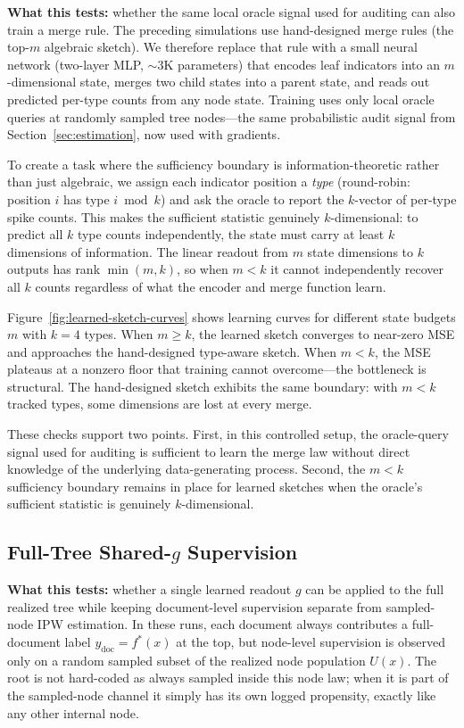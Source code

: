 \textbf{What this tests:} whether the same local oracle signal used for auditing can also train a merge rule. The preceding simulations use hand-designed merge rules (the top-$m$ algebraic sketch). We therefore replace that rule with a small neural network (two-layer MLP, ${\sim}\!3$K parameters) that encodes leaf indicators into an $m$-dimensional state, merges two child states into a parent state, and reads out predicted per-type counts from any node state. Training uses only local oracle queries at randomly sampled tree nodes---the same probabilistic audit signal from Section~\ref{sec:estimation}, now used with gradients.

To create a task where the sufficiency boundary is information-theoretic rather than just algebraic, we assign each indicator position a \emph{type} (round-robin: position $i$ has type $i \bmod k$) and ask the oracle to report the $k$-vector of per-type spike counts. This makes the sufficient statistic genuinely $k$-dimensional: to predict all $k$ type counts independently, the state must carry at least $k$ dimensions of information. The linear readout from $m$ state dimensions to $k$ outputs has rank $\min(m, k)$, so when $m < k$ it cannot independently recover all $k$ counts regardless of what the encoder and merge function learn.

Figure~\ref{fig:learned-sketch-curves} shows learning curves for different state budgets $m$ with $k=4$ types. When $m \ge k$, the learned sketch converges to near-zero MSE and approaches the hand-designed type-aware sketch. When $m < k$, the MSE plateaus at a nonzero floor that training cannot overcome---the bottleneck is structural. The hand-designed sketch exhibits the same boundary: with $m < k$ tracked types, some dimensions are lost at every merge.

These checks support two points. First, in this controlled setup, the oracle-query signal used for auditing is sufficient to learn the merge law without direct knowledge of the underlying data-generating process. Second, the $m < k$ sufficiency boundary remains in place for learned sketches when the oracle's sufficient statistic is genuinely $k$-dimensional.

\subsection{Full-Tree Shared-$g$ Supervision}

\textbf{What this tests:} whether a single learned readout $g$ can be applied to the full realized tree while keeping document-level supervision separate from sampled-node IPW estimation. In these runs, each document always contributes a full-document label $y_{\mathrm{doc}}=f^\ast(x)$ at the top, but node-level supervision is observed only on a random sampled subset of the realized node population $U(x)$. The root is not hard-coded as always sampled inside this node law; when it is part of the sampled-node channel it simply has its own logged propensity, exactly like any other internal node.

